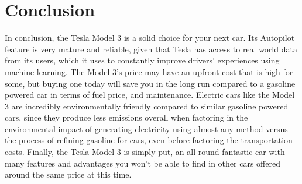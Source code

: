 \documentclass{article}
\begin{document}
  \section{Conclusion}
  In conclusion, the Tesla Model 3 is a solid choice for your next car.
  Its Autopilot feature is very mature and reliable, given that Tesla has access to
  real world data from its users, which it uses to constantly improve drivers'
  experiences using machine learning. The Model 3's price may have an upfront cost
  that is high for some, but buying one today will save you in the long run
  compared to a gasoline powered car in terms of fuel price, and maintenance.
  Electric cars like the Model 3 are incredibly environmentally friendly compared
  to similar gasoline powered cars, since they produce less emissions overall
  when factoring in the environmental impact of generating electricity using
  almost any method versus the process of refining gasoline for cars, even before
  factoring the transportation costs. Finally, the Tesla Model 3 is simply put,
  an all-round fantastic car with many features and advantages you won't be able
  to find in other cars offered around the same price at this time.

\end{document}
